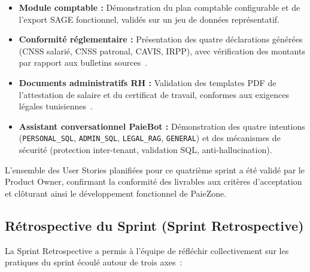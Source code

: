 \begin{itemize}[label=\textbullet, leftmargin=0.6cm]
    \item \textbf{Module comptable :} Démonstration du plan comptable
    configurable et de l'export SAGE fonctionnel, validés sur un jeu de
    données représentatif.
    \item \textbf{Conformité réglementaire :} Présentation des quatre
    déclarations générées (CNSS salarié, CNSS patronal, CAVIS, IRPP),
    avec vérification des montants par rapport aux bulletins sources~\cite{cnss_reg,lf2026}.
    \item \textbf{Documents administratifs RH :} Validation des templates
    PDF de l'attestation de salaire et du certificat de travail,
    conformes aux exigences légales tunisiennes~\cite{flyingsaucer}.
    \item \textbf{Assistant conversationnel PaieBot :} Démonstration des
    quatre intentions (\texttt{PERSONAL\_SQL}, \texttt{ADMIN\_SQL},
    \texttt{LEGAL\_RAG}, \texttt{GENERAL}) et des mécanismes de
    sécurité (protection inter-tenant, validation SQL, anti-hallucination).
\end{itemize}

L'ensemble des User Stories planifiées pour ce quatrième sprint a été
validé par le Product Owner, confirmant la conformité des livrables
aux critères d'acceptation et clôturant ainsi le développement
fonctionnel de PaieZone.

\subsection{Rétrospective du Sprint (Sprint Retrospective)}

La Sprint Retrospective a permis à l'équipe de réfléchir collectivement
sur les pratiques du sprint écoulé autour de trois axes~:

